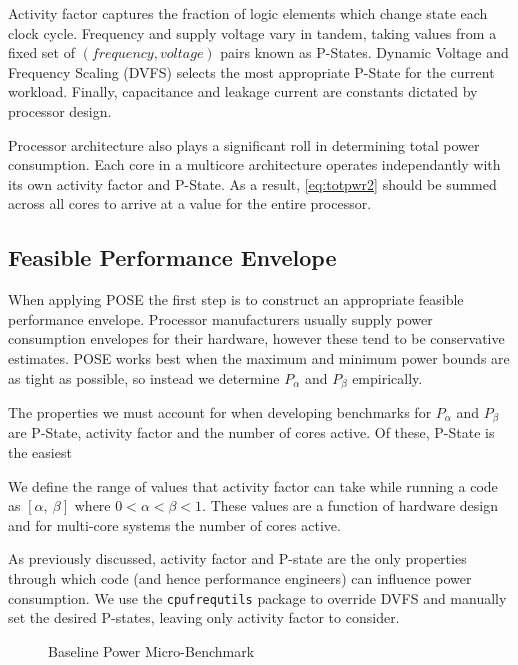 Activity factor captures the fraction of logic elements which change state each clock cycle.
Frequency and supply voltage vary in tandem, taking values from a fixed set of $(frequency, voltage)$ pairs known as P-States.
Dynamic Voltage and Frequency Scaling (DVFS) selects the most appropriate P-State for the current workload.
Finally, capacitance and leakage current are constants dictated by processor design.

Processor architecture also plays a significant roll in determining total power consumption.
Each core in a multicore architecture operates independantly with its own activity factor and P-State.
As a result, \autoref{eq:totpwr2} should be summed across all cores to arrive at a value for the entire processor.

\subsection{Feasible Performance Envelope}
When applying POSE the first step is to construct an appropriate feasible performance envelope.
Processor manufacturers usually supply power consumption envelopes for their hardware, however these tend to be conservative estimates.
POSE works best when the maximum and minimum power bounds are as tight as possible, so instead we determine $P_{\alpha}$ and $P_{\beta}$ empirically. 

The properties we must account for when developing benchmarks for $P_{\alpha}$ and $P_{\beta}$ are P-State, activity factor and the number of cores active.
Of these, P-State is the easiest 

\clearpage


We define the range of values that activity factor can take while running a code as $[\alpha,~\beta]$ where $0 < \alpha < \beta < 1$. These values are a function of hardware design and for multi-core systems the number of cores active.


As previously discussed, activity factor and P-state are the only properties through which code (and hence performance engineers) can influence power consumption.
We use the \texttt{cpufrequtils} package to override DVFS and manually set the desired P-states, leaving only activity factor to consider.

\begin{figure}[ht]                                                               
\centering                                                                      
\lstset{basicstyle=\ttfamily\footnotesize\bfseries, frame=tb} %
              
\caption{Baseline Power Micro-Benchmark}                            
\label{fig:microbench}                                                           
\end{figure}  

